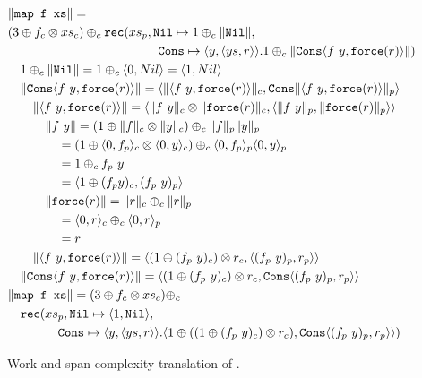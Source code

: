 \begin{figure}
  \label{fig:ws_map_complexity_translation}
  \caption{Work and span complexity translation of .}
  \[\begin{split}
    &\|\texttt{map f xs}\| = \\
    &  (3 \oplus f_c \otimes xs_c) \oplus_c \texttt{rec}(xs_p, \texttt{Nil}\mapsto 1 \oplus_c \|\texttt{Nil}\|, \\
    &\qquad\quad\quad\quad\qquad\quad\quad\quad\qquad \texttt{Cons} \mapsto \langle y, \langle ys, r \rangle \rangle. 1 \oplus_c \|\texttt{Cons}\langle f\ y, \texttt{force}(r)\rangle \|) \\
    &\quad 1 \oplus_c \|\texttt{Nil}\| = 1 \oplus_c \langle 0, Nil \rangle = \langle 1, Nil \rangle \\
    &\quad\|\texttt{Cons}\langle f\ y, \texttt{force}(r)\rangle \| = \langle \|\langle f\ y, \texttt{force}(r)\rangle\|_c, \texttt{Cons} \| \langle f\ y, \texttt{force}(r)\rangle \|_p\rangle \\
    &\qquad \|\langle f\ y, \texttt{force}(r)\rangle\| = \langle \|f\ y\|_c \otimes \|\texttt{force}(r)\|_c, \langle \|f\ y\|_p, \|\texttt{force}(r)\|_p\rangle\rangle \\
    &\qquad\quad \|f\ y\| = (1 \oplus \|f\|_c \otimes \|y\|_c) \oplus_c \|f\|_p \|y\|_p \\
    &\qquad\quad\quad = (1 \oplus \langle 0, f_p \rangle_c \otimes \langle 0, y \rangle_c) \oplus_c \langle 0, f_p \rangle_p \langle 0, y \rangle_p \\
    &\qquad\quad\quad = 1 \oplus_c f_p\ y \\
    &\qquad\quad\quad = \langle 1 \oplus (f_p y)_c, (f_p\ y)_p \rangle \\
    &\qquad\quad \|\texttt{force}(r)\| = \|r\|_c \oplus_c \|r\|_p \\
    &\qquad\quad\quad = \langle 0, r \rangle_c \oplus_c \langle 0, r \rangle_p \\
    &\qquad\quad\quad = r \\
    &\qquad \|\langle f\ y, \texttt{force}(r)\rangle\| = \langle (1 \oplus (f_p\ y)_c) \otimes r_c, \langle (f_p\ y)_p, r_p \rangle \rangle \\
    &\quad\|\texttt{Cons}\langle f\ y, \texttt{force}(r)\rangle \| = \langle (1 \oplus (f_p\ y)_c) \otimes r_c, \texttt{Cons} \langle (f_p\ y)_p, r_p \rangle \rangle \\
    &\|\texttt{map f xs}\| = (3 \oplus f_c \otimes xs_c) \oplus_c \\
    &\quad \texttt{rec}(xs_p, \texttt{Nil}\mapsto \langle 1, \texttt{Nil}\rangle, \\
    &\qquad\quad\quad \texttt{Cons} \mapsto \langle y, \langle ys, r \rangle \rangle. \langle 1 \oplus ((1 \oplus (f_p\ y)_c) \otimes r_c), \texttt{Cons} \langle (f_p\ y)_p, r_p \rangle \rangle)
  \end{split}\]
\end{figure}
